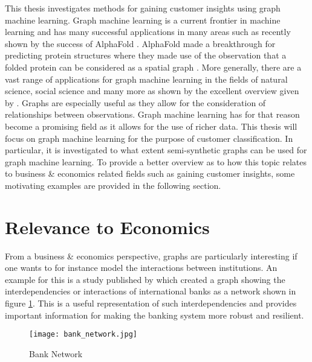 	
	This thesis investigates methods for gaining customer insights using graph
	machine learning. Graph machine learning is a current frontier in machine 
	learning and has many successful applications in many areas such as recently 
	shown by the success of AlphaFold \citep{senior2020improved}. AlphaFold made 
	a breakthrough for predicting protein structures where they made use of the 
	observation that a folded protein can be considered as a spatial graph 
	\citep{AlphaFoldTeam2020}. More generally, there are a vast range of 
	applications for graph machine learning in the fields of natural science, 
	social science and many more as shown by the excellent overview given by 
	\cite{zhou2020graph}. Graphs are especially useful as they allow for the 
	consideration of relationships between observations. Graph machine learning 
	has for that reason become a promising field as it allows for the use of
	richer data. This thesis will focus on graph machine learning for the
	purpose of customer classification. In particular, it is investigated to
	what extent semi-synthetic graphs can be used for graph machine learning.
	To provide a better overview as to how this topic relates to business \& 
	economics related fields such as gaining customer insights, some motivating
	examples are provided in the following section. 
	
	\section{Relevance to Economics}

	\noindent From a business \& economics perspective, graphs are particularly
	interesting if one wants to for instance model the interactions between
	institutions. An example for this is a study published by
	\cite{schweitzer2009economic} which created a graph showing the 
	interdependencies or interactions of international banks as a network shown 
	in figure \ref{fig:bank_network}. This is a useful representation of 
	such interdependencies and provides important information for making the
	banking system more robust and resilient. 

	\begin{figure}[h]
		\centering
		\texttt{[image: bank\_network.jpg]}
		\caption{Bank Network}
		\cite[p. 424]{schweitzer2009economic}
		\label{fig:bank_network}
	\end{figure} 

